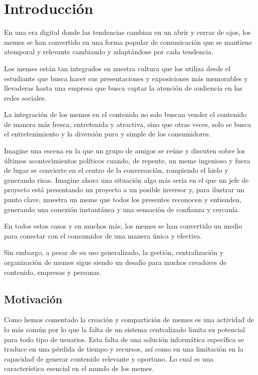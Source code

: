 \chapter{Introducción}

En una era digital donde las tendencias cambian en un abrir y cerrar de ojos, los memes se han convertido en una forma popular de comunicación que se mantiene atemporal y relevante cambiando y adaptándose por cada tendencia.

Los memes están tan integrados en nuestra cultura que los utiliza desde el estudiante que busca hacer sus presentaciones y exposiciones más memorables y llevaderas hasta una empresa que busca captar la atención de audiencia en las redes sociales.

La integración de los memes en el contenido no solo buscan vender el contenido de manera más fresca, entretenida y atractiva, sino que otras veces, solo se busca el entretenimiento y la diversión pura y simple de los consumidores.

Imagine una escena en la que un grupo de amigos se reúne y discuten sobre los últimos acontecimientos políticos cuando, de repente, un meme ingenioso y fuera de lugar se convierte en el centro de la conversación, rompiendo el hielo y generando risas. Imagine ahora una situación algo más seria en el que un jefe de proyecto está presentando un proyecto a un posible inversor y, para ilustrar un punto clave, muestra un meme que todos los presentes reconocen y entienden, generando una conexión instantánea y una sensación de confianza y cercanía.

En todos estos casos y en muchos más, los memes se han convertido un medio para conectar con el consumidor de una manera única y efectiva.

Sin embargo, a pesar de su uso generalizado, la gestión, centralización y organización de memes sigue siendo un desafío para muchos creadores de contenido, empresas y personas.

\section{Motivación}

Como hemos comentado la creación y compartición de memes es una actividad de lo más común por lo que la falta de un sistema centralizado limita su potencial para todo tipo de usuarios. Esta falta de una solución informática específica se traduce en una pérdida de tiempo y recursos, así como en una limitación en la capacidad de generar contenido relevante y oportuno. Lo cual es una característica esencial en el mundo de los memes.

